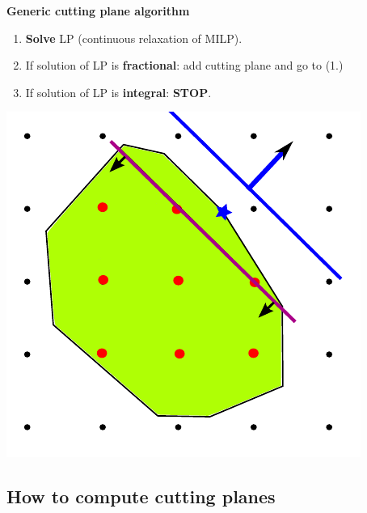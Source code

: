 \documentclass[../open-optimization/open-optimization.tex]{subfiles}
\begin{document}
\begin{multicols}{2}

{\bf Generic cutting plane algorithm}

\vspace{-1cm}

\begin{enumerate}
\setlength{\itemsep}{0.01cm}
\item {\bf  Solve} LP (continuous relaxation of MILP).
\item If solution of LP is {\bf  fractional}: add cutting plane and go to (1.)
\item If solution of LP is {\bf integral}: { \bf STOP}.
\end{enumerate}

\columnbreak

\begin{center}
\includegraphics[scale=0.75]{CPalgorithm6.pdf}
\end{center}

\end{multicols}

\vspace{-1cm}

\subsection{How to compute cutting planes}
\end{document}
